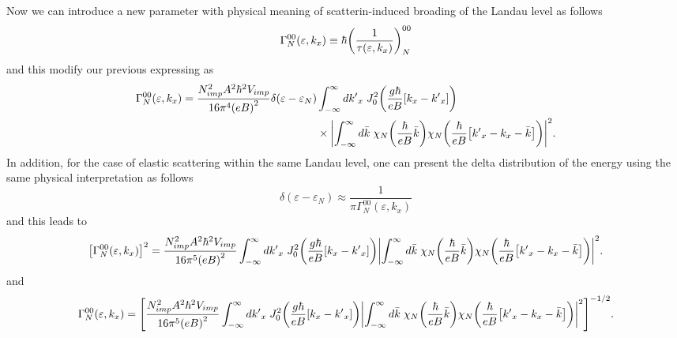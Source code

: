 \noindent
Now we can introduce a new parameter with physical meaning of scatterin-induced broading of the Landau level as follows
\begin{equation} \label{5.3}
  \Gamma^{00}_{N}(\varepsilon,k_x) \equiv \hbar \qty(\frac{1}{\tau(\varepsilon,k_x)})^{00}_{N}
\end{equation}
and this modify our previous expressing as
\begin{equation} \label{5.4}
  \begin{aligned}
    \Gamma^{00}_{N}(\varepsilon,k_x)  =
    \frac { N_{imp}^2 A^2 \hbar^2 V_{imp}}{16\pi^4 \qty(eB)^2}
    \delta(\varepsilon - \varepsilon_{N}) &
    \int_{-\infty}^{\infty} d {k'}_x \;
    J_0^2\qty(\frac{g\hbar}{eB}[{k}_x - {k'}_x])
    \\
    & \times
    \qty|
    \int_{-\infty}^{\infty} d\bar{k} \;
    {\chi}_{N}\qty(\frac{\hbar}{eB}\bar{k})
    {\chi}_{N}\qty(\frac{\hbar}{eB} \qty[{k'}_x - {k}_x - \bar{k}])|^2.
  \end{aligned}
\end{equation}
In addition, for the case of elastic scattering within the same Landau level, one can present the delta distribution of the energy using the same physical interpretation as follows
\begin{equation} \label{5.5}
  \delta(\varepsilon - \varepsilon_{N}) \approx
  \frac{1}{\pi \Gamma^{00}_{N}(\varepsilon,k_x)}
\end{equation}
and this leads to
\begin{equation} \label{5.6}
  \begin{aligned}
    \qty[\Gamma^{00}_{N}(\varepsilon,k_x)]^2  =
    \frac { N_{imp}^2 A^2 \hbar^2 V_{imp}}{16\pi^5 \qty(eB)^2}
    \int_{-\infty}^{\infty} d {k'}_x \;
    J_0^2\qty(\frac{g\hbar}{eB}[{k}_x - {k'}_x])
    \qty|
    \int_{-\infty}^{\infty} d\bar{k} \;
    {\chi}_{N}\qty(\frac{\hbar}{eB}\bar{k})
    {\chi}_{N}\qty(\frac{\hbar}{eB} \qty[{k'}_x - {k}_x - \bar{k}])|^2.
  \end{aligned}
\end{equation}
and
\begin{equation} \label{5.7}
  \begin{aligned}
    \Gamma^{00}_{N}(\varepsilon,k_x)  =
    \qty[
    \frac { N_{imp}^2 A^2 \hbar^2 V_{imp}}{16\pi^5 \qty(eB)^2}
    \int_{-\infty}^{\infty} d {k'}_x \;
    J_0^2\qty(\frac{g\hbar}{eB}[{k}_x - {k'}_x])
    \qty|
    \int_{-\infty}^{\infty} d\bar{k} \;
    {\chi}_{N}\qty(\frac{\hbar}{eB}\bar{k})
    {\chi}_{N}\qty(\frac{\hbar}{eB} \qty[{k'}_x - {k}_x - \bar{k}])|^2
    ]^{-1/2}.
  \end{aligned}
\end{equation}


